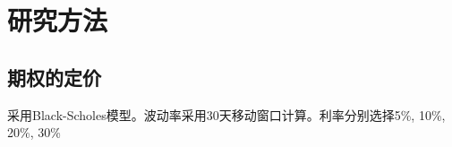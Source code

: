 \documentclass[UTF8]{ctexart}
\begin{document}
\section{研究方法}
    \subsection{期权的定价}
    采用Black-Scholes模型。波动率采用30天移动窗口计算。利率分别选择5\%, 10\%, 20\%, 30\%
\end{document}
